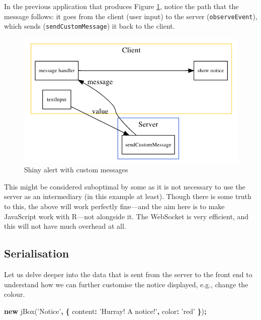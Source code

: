 \documentclass[10pt,]{krantz}
\makeatletter
\newenvironment{Shaded}{\begin{snugshade}}{\end{snugshade}}
\newcommand{\AttributeTok}[1]{\textcolor[rgb]{0.61,0.61,0.61}{#1}}
\newcommand{\DataTypeTok}[1]{\textcolor[rgb]{0.27,0.27,0.27}{#1}}
\newcommand{\KeywordTok}[1]{\textcolor[rgb]{0.27,0.27,0.27}{\textbf{#1}}}
\newcommand{\NormalTok}[1]{#1}
\newcommand{\OperatorTok}[1]{\textcolor[rgb]{0.43,0.43,0.43}{\textbf{#1}}}
\newcommand{\StringTok}[1]{\textcolor[rgb]{0.5,0.5,0.5}{#1}}
\newenvironment{kframe}{%
\medskip{}
\setlength{\fboxsep}{.8em}
 \def\at@end@of@kframe{}%
 \ifinner\ifhmode%
  \def\at@end@of@kframe{\end{minipage}}%
  \begin{minipage}{\columnwidth}%
 \fi\fi%
 \def\FrameCommand##1{\hskip\@totalleftmargin \hskip-\fboxsep
 \colorbox{shadecolor}{##1}\hskip-\fboxsep
     \hskip-\linewidth \hskip-\@totalleftmargin \hskip\columnwidth}%
 \MakeFramed {\advance\hsize-\width
   \@totalleftmargin\z@ \linewidth\hsize
   \@setminipage}}%
 {\par\unskip\endMakeFramed%
 \at@end@of@kframe}
\renewenvironment{Shaded}{\begin{kframe}}{\end{kframe}}
\makeatother
\begin{document}
In the previous application that produces Figure \ref{fig:shiny-alert-diagram}, notice the path that the message follows: it goes from the client (user input) to the server (\texttt{observeEvent}), which sends (\texttt{sendCustomMessage}) it back to the client.

\begin{figure}[H]

{\centering \includegraphics[width=1\linewidth]{images/04-custom-msg} 

}

\caption{Shiny alert with custom messages}\label{fig:shiny-alert-diagram}
\end{figure}

This might be considered suboptimal by some as it is not necessary to use the server as an intermediary (in this example at least). Though there is some truth to this, the above will work perfectly fine---and the aim here is to make JavaScript work with R---not alongside it. The WebSocket is very efficient, and this will not have much overhead at all.

\hypertarget{shiny-intro-serialise}{%
\subsection{Serialisation}\label{shiny-intro-serialise}}

Let us delve deeper into the data that is sent from the server to the front end to understand how we can further customise the notice displayed, e.g., change the colour.

\begin{Shaded}
\begin{Highlighting}[]
\KeywordTok{new} \AttributeTok{jBox}\NormalTok{(}\StringTok{'Notice'}\OperatorTok{,} \OperatorTok{\{}
  \DataTypeTok{content}\OperatorTok{:} \StringTok{'Hurray! A notice!'}\OperatorTok{,}
  \DataTypeTok{color}\OperatorTok{:} \StringTok{'red'}
\OperatorTok{\}}\NormalTok{)}\OperatorTok{;}
\end{Highlighting}
\end{Shaded}
\end{document}
